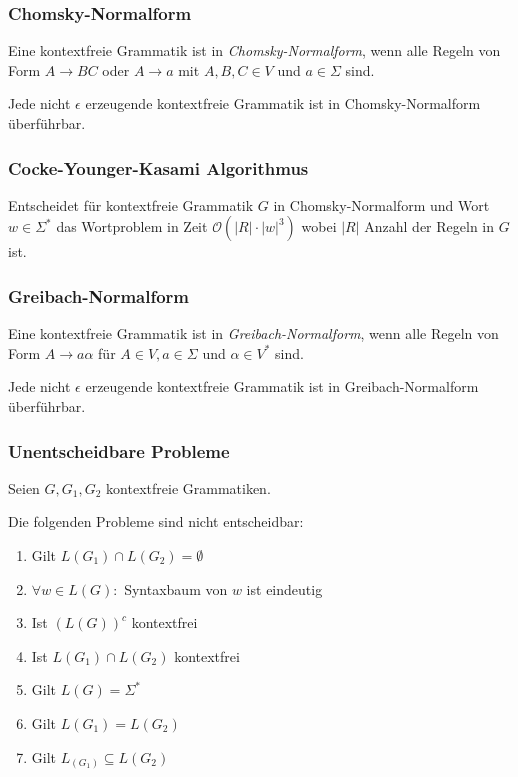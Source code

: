 \subsubsection*{Chomsky-Normalform}

Eine kontextfreie Grammatik ist in \emph{Chomsky-Normalform}, wenn alle Regeln von Form $A \to BC$ oder $A \to a$ mit $A,B,C \in V$ und $a \in \Sigma$ sind.

\spacing

Jede nicht $\epsilon$ erzeugende kontextfreie Grammatik ist in Chomsky-Normalform überführbar.

\subsubsection*{Cocke-Younger-Kasami Algorithmus}

Entscheidet für kontextfreie Grammatik $G$ in Chomsky-Normalform und Wort $w \in \Sigma^*$ das Wortproblem in Zeit $\mathcal{O}(|R|\cdot |w|^3)$ wobei $|R|$ Anzahl der Regeln in $G$ ist.

\subsubsection*{Greibach-Normalform}

Eine kontextfreie Grammatik ist in \emph{Greibach-Normalform}, wenn alle Regeln von Form $A \to a\alpha$ für $A \in V, a \in \Sigma$ und $\alpha \in V^*$ sind.

\spacing

Jede nicht $\epsilon$ erzeugende kontextfreie Grammatik ist in Greibach-Normalform überführbar.

\subsubsection*{Unentscheidbare Probleme}

Seien $G, G_1, G_2$ kontextfreie Grammatiken.

Die folgenden Probleme sind nicht entscheidbar:

\begin{enumerate}
\item Gilt $L(G_1) \cap L(G_2) = \emptyset$
\item $\forall w \in L(G) : $ Syntaxbaum von $w$ ist eindeutig
\item Ist $(L(G))^c$ kontextfrei
\item Ist $L(G_1) \cap L(G_2)$ kontextfrei
\item Gilt $L(G) = \Sigma^*$
\item Gilt $L(G_1) = L(G_2)$
\item Gilt $L_(G_1) \subseteq L(G_2)$
\end{enumerate}
